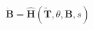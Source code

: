 \documentclass[preview]{standalone}
\begin{document}
\begin{align*}
\dot{\mathbf{B}} = \hat{\mathbf{H}}(\tilde{\mathbf{T}},\theta,\mathbf{B},s)
\end{align*}
\end{document}
